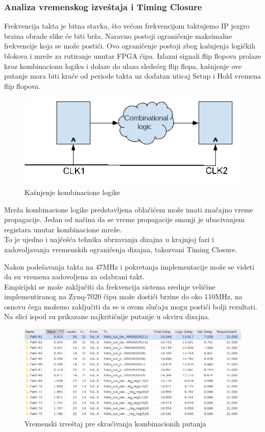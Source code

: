 \subsubsection{Analiza vremenskog izveštaja i Timing Closure}

Frekvencija takta je bitna stavka, što većom frekvencijom taktujemo IP jezgro
brzina obrade slike će biti brža.
Naravno postoji ograničenje maksimalne frekvencije koja se može postići.
Ovo ograničenje postoji zbog kašnjenja logičkih blokova i mreže za rutiranje unutar FPGA čipa.
Izlazni signali flip flopova prolaze kroz kombinacionu logiku i dolaze do ulaza
sledećeg flip flopa, kašnjenje ove putanje mora biti kraće od periode takta uz
dodatan uticaj Setup i Hold vremena flip flopova.

\begin{figure}[H]
  \centering
  \includegraphics[width=0.55\linewidth]{images/comb.png}
  \caption{Kašnjenje kombinacione logike}
  \label{comb_logic}
\end{figure}

Mreža kombinacione logike predstavljena oblačićem može imati značajno vreme
propagacije.
Jedan od načina da se vreme propagacije smanji je ubacivanjem registara unutar
kombinacione mreže. \\
To je ujedno i najčešća tehnika ubrzavanja dizajna u krajnjoj fazi i
zadovoljavanja vremenskih ograničenja dizajna, takozvani Timing Closure. \\

\newpage

Nakon podešavanja takta na 47MHz i pokretanja implementacije može se videti da
su vremena zadovoljena za odabrani takt. \\
Empirijski se može zaključiti da frekvencija sistema srednje veličine
implementiranog na Zynq-7020 čipu može dostići brzine do oko 110MHz, na osnovu
čega možemo zaključiti da se u ovom slučaju mogu postići bolji
rezultati. \\
Na slici ispod su prikazane najkritičnije putanje u okviru dizajna. \\

\begin{figure}[H]
  \centering
  \includegraphics[width=1\linewidth]{results/implementation/pygears_slow/timing.png}
  \caption{Vremenski izveštaj pre skraćivanja kombinacionih putanja}
  \label{slow_time}
\end{figure}

